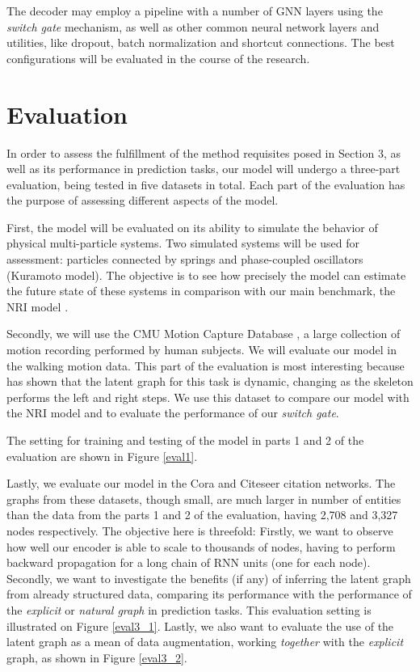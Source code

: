 \documentclass[12pt,a4paper]{article}
\begin{document}
	The decoder may employ a pipeline with a number of GNN layers using the \emph{switch gate} mechanism, as well as other common neural network layers and utilities, like dropout, batch normalization and shortcut connections. The best configurations will be evaluated in the course of the research.

	\section{Evaluation}
	\label{sec:Evaluation}

	In order to assess the fulfillment of the method requisites posed in Section 3, as well as its performance in prediction tasks, our model will undergo a three-part evaluation, being tested in five datasets in total. Each part of the evaluation has the purpose of assessing different aspects of the model.

	First, the model will be evaluated on its ability to simulate the behavior of physical multi-particle systems. Two simulated systems will be used for assessment: particles connected by springs and phase-coupled oscillators (Kuramoto model). The objective is to see how precisely the model can estimate the future state of these systems in comparison with our main benchmark, the NRI model \citep{KipfNRI2018}.

	Secondly, we will use the CMU Motion Capture Database \citep{CMU2003}, a large collection of motion recording performed by human subjects. We will evaluate our model in the walking motion data. This part of the evaluation is most interesting because \textcite{KipfNRI2018} has shown that the latent graph for this task is dynamic, changing as the skeleton performs the left and right steps. We use this dataset to compare our model with the NRI model and to evaluate the performance of our \emph{switch gate}.

	The setting for training and testing of the model in parts 1 and 2 of the evaluation are shown in Figure \ref{eval1}.

	Lastly, we evaluate our model in the Cora and Citeseer citation networks. The graphs from these datasets, though small, are much larger in number of entities than the data from the parts 1 and 2 of the evaluation, having 2,708 and 3,327 nodes respectively. The objective here is threefold: Firstly, we want to observe how well our encoder is able to scale to thousands of nodes, having to perform backward propagation for a long chain of RNN units (one for each node). Secondly, we want to investigate the benefits (if any) of inferring the latent graph from already structured data, comparing its performance with the performance of the \emph{explicit} or \emph{natural graph} in prediction tasks. This evaluation setting is illustrated on Figure \ref{eval3_1}. Lastly, we also want to evaluate the use of the latent graph as a mean of data augmentation, working \emph{together} with the \emph{explicit} graph, as shown in Figure \ref{eval3_2}.
\end{document}
